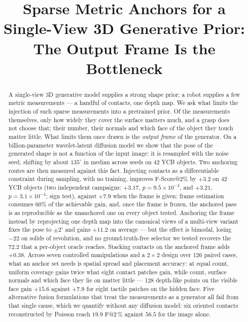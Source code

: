 \documentclass[conference]{IEEEtran}
\title{\LARGE\bf Sparse Metric Anchors for a Single-View 3D Generative Prior:\\
The Output Frame Is the Bottleneck}
\author{%
  \IEEEauthorblockN{Author Name}
  \IEEEauthorblockA{Institut des Syst\`emes Intelligents et de Robotique (ISIR)\\
  Sorbonne Universit\'e, Paris, France\\
  \texttt{author@isir.upmc.fr}}%
}
\makeatletter
\newcommand{\Fs}{F@2\,\%}
\makeatother
\begin{document}
\maketitle

\begin{abstract}
A single-view 3D generative model supplies a strong shape prior; a robot supplies a
few metric measurements --- a handful of contacts, one depth map. We ask what limits
the injection of such sparse measurements into a pretrained prior. Of the measurements
themselves, only how widely they cover the surface matters much, and a grasp does not
choose that; their number, their normals and which face of the object they touch matter
little. What limits them once drawn is the \emph{output frame} of the generator. On a billion-parameter wavelet-latent
diffusion model we show that the pose of the generated shape is not a function of the
input image: it is resampled with the noise seed, shifting by about $135^\circ$ in median
across seeds on 42 YCB objects. Two anchoring routes are then measured against this
fact. Injecting contacts as a differentiable constraint during sampling, with no
training, improves F-Score@2\% by $+3.2$ on 42 YCB objects (two independent campaigns:
$+3.17$, $p = 9.5\times10^{-3}$, and $+3.21$, $p = 3.1\times10^{-4}$; sign test),
against $+7.9$ when the frame is given: frame estimation consumes 60\% of the
achievable gain, and, once the frame is frozen, the anchored pass is as reproducible as the
unanchored one on every object tested. Anchoring the frame instead by
reprojecting one depth map into the canonical views of a multi-view variant fixes the
pose to $\pm 2^\circ$ and gains $+11.2$ on average --- but the effect is bimodal,
losing $-22$ on solids of revolution, and no ground-truth-free selector we tested
recovers the $72.2$ that a per-object oracle reaches. Stacking contacts on the anchored
frame adds $+0.38$. Across seven controlled manipulations and a $2\times2$ design over
126 paired cases, what an anchor set needs is spatial spread and placement accuracy: at
equal count, uniform coverage gains twice what eight contact patches gain, while count,
surface normals and which face they lie on matter little --- 128 depth-like points on
the visible face gain $+15.6$ against $+7.9$ for eight tactile patches on the hidden
face. Five alternative fusion formulations that treat the measurements as a
generator all fail from that single cause, which we quantify without any diffusion
model: six oriented contacts reconstructed by Poisson reach $19.9$ \Fs{} against
$56.5$ for the image alone.
\end{abstract}
\end{document}
